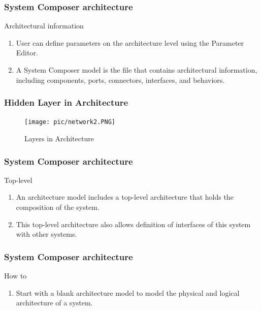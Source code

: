 \begin{frame}
\frametitle{System Composer architecture }
\begin{block}{ Architectural information }
\begin{enumerate}
 \setlength{\itemsep}{0pt}
      \item      User can define parameters on the architecture level using the Parameter Editor.
    \item   A System Composer model is the file that contains architectural information, including components, ports, connectors, interfaces, and behaviors. 
\end{enumerate}

\end{block}
\end{frame}

\begin{frame}
\frametitle{Hidden Layer in Architecture }
\begin{figure}
\texttt{[image: pic/network2.PNG]}
\caption{ Layers in Architecture }
\label{Layer1}
\end{figure}
\end{frame}

\begin{frame}
\frametitle{System Composer architecture }
\begin{block}{ Top-level  }
\begin{enumerate}
 \setlength{\itemsep}{0pt}
      \item    An architecture model includes a top-level architecture that holds the composition of the system. 
    \item    This top-level architecture also allows definition of interfaces of this system with other systems.
\end{enumerate}
\end{block}
\end{frame}


\begin{frame}
\frametitle{System Composer architecture }
\begin{block}{ How to }
\begin{enumerate}
 \setlength{\itemsep}{0pt}
      \item     Start with a blank architecture model to model the physical and logical architecture of a system.
\end{enumerate}

\end{block}
\end{frame}









